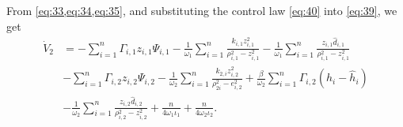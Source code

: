 \documentclass[pdflatex,sn-mathphys-num]{sn-jnl}%
\theoremstyle{thmstyleone}%
\theoremstyle{thmstyletwo}%
\theoremstyle{thmstylethree}%
\begin{document}





From \cref{eq:33,eq:34,eq:35}, and substituting the control law \cref{eq:40} into \cref{eq:39}, we get
\begin{equation}\label{eq:44}
	\begin{aligned}
		\dot{V}_{2}
		& = - \sum_{i=1}^{n}\varGamma_{i,1}z_{i,1}\Psi_{i,1}  - \frac{1}{\omega_{1}}\sum_{i=1}^{n}\frac{k_{i,1} z_{i,1}^2}{\rho_{i,1}^2 - z_{i,1}^2}- \frac{1}{\omega_{1}}\sum_{i=1}^{n} \frac{ z_{i,1}\hat d_{i,1}}{\rho_{i,1}^2 - z_{i,1}^2} \\
		 & - \sum_{i=1}^{n}\varGamma_{i,2}z_{i,2}\Psi_{i,2} - \frac{1}{\omega_{2}}\sum_{i=1}^{n}\frac{ k_{2,i} z_{i,2}^2}{\rho_{2i}^2 - e_{i,2}^2}  + \frac{\beta }{\omega_{2}}\sum_{i=1}^{n} \varGamma_{i,2} (h_{i}-\hat{h}_{i})  \\
		 &- \frac{1}{\omega_{2}}\sum_{i=1}^{n} \frac{ z_{i,2}\hat d_{i,2}}{\rho_{i,2}^2 - z_{i,2}^2}+ \frac{n}{4  \omega_{1} \iota_1 } + \frac{n}{4  \omega_{2}\iota_2 }  .                           
	\end{aligned}
\end{equation}
\end{document}
